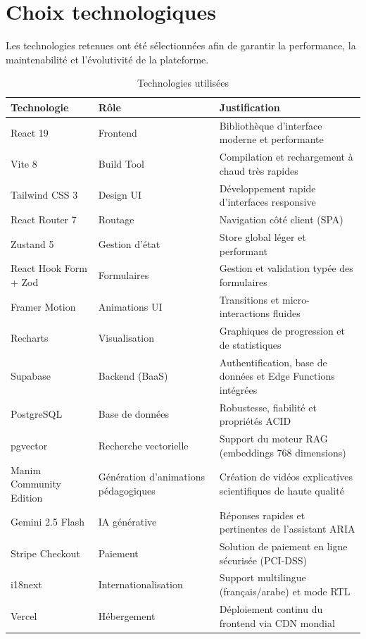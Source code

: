 \documentclass[12pt, a4paper]{report}
\begin{document}
\section{Choix technologiques}

Les technologies retenues ont été sélectionnées afin de garantir
la performance, la maintenabilité et l'évolutivité de la plateforme.

\begin{table}[H]
\centering
\caption{Technologies utilisées}
\label{tab:technologies}
\begin{tabularx}{\textwidth}{|>{\centering\arraybackslash}p{2.5cm}|X|p{3.8cm}|}
\hline
\textbf{Technologie} & \textbf{Rôle} & \textbf{Justification} \\
\hline
React 19 & Frontend & Bibliothèque d'interface moderne et performante \\
\hline
Vite 8 & Build Tool & Compilation et rechargement à chaud très rapides \\
\hline
Tailwind CSS 3 & Design UI & Développement rapide d'interfaces responsive \\
\hline
React Router 7 & Routage & Navigation côté client (SPA) \\
\hline
Zustand 5 & Gestion d'état & Store global léger et performant \\
\hline
React Hook Form + Zod & Formulaires & Gestion et validation typée des formulaires \\
\hline
Framer Motion & Animations UI & Transitions et micro-interactions fluides \\
\hline
Recharts & Visualisation & Graphiques de progression et de statistiques \\
\hline
Supabase & Backend (BaaS) & Authentification, base de données et Edge Functions intégrées \\
\hline
PostgreSQL & Base de données & Robustesse, fiabilité et propriétés ACID \\
\hline
pgvector & Recherche vectorielle & Support du moteur RAG (embeddings 768 dimensions) \\
\hline
Manim Community Edition &
Génération d'animations pédagogiques &
Création de vidéos explicatives scientifiques de haute qualité \\

\hline
Gemini 2.5 Flash & IA générative & Réponses rapides et pertinentes de l'assistant ARIA \\
\hline
Stripe Checkout & Paiement & Solution de paiement en ligne sécurisée (PCI-DSS) \\
\hline
i18next & Internationalisation & Support multilingue (français/arabe) et mode RTL \\
\hline
Vercel & Hébergement & Déploiement continu du frontend via CDN mondial \\
\hline
\end{tabularx}
\end{table}
\end{document}
